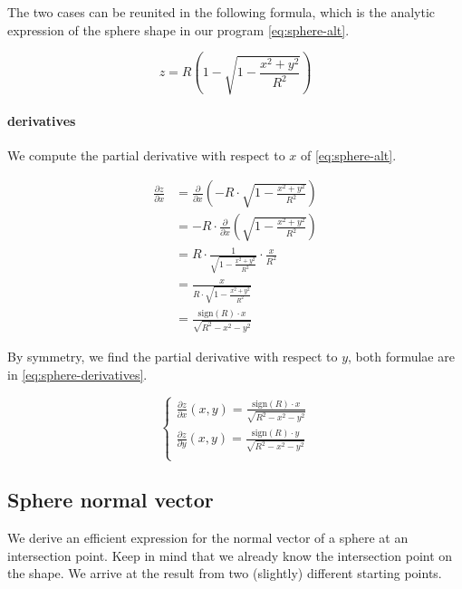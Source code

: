 The two cases can be reunited in the following formula, which is the
analytic expression of the sphere shape in our program \cref{eq:sphere-alt}.

\begin{equation} \label{eq:sphere-alt}
z = R \left( 1 - \sqrt{1 - \frac{x^2 + y^2}{R^2}} \right)
\end{equation}

\paragraph{derivatives}
We compute the partial derivative with respect to $x$ of \cref{eq:sphere-alt}.

\begin{equation} \begin{split}
\frac{\partial z}{\partial x} & = 
\frac{\partial}{\partial x}
\left( -R \cdot \sqrt{1 - \frac{x^2 + y^2}{R^2}} \right) \\
& = - R \cdot \frac{\partial}{\partial x}
\left( \sqrt{1 - \frac{x^2 + y^2}{R^2}} \right) \\
& = R \cdot \frac{1}{\sqrt{1 - \frac{x^2 + y^2}{R^2}}} \cdot
\frac{x}{R^2} \\
& = \frac{x}{R \cdot \sqrt{1 - \frac{x^2 + y^2}{R^2}}} \\
& = \frac{\textrm{sign}(R) \cdot x}{\sqrt{R^2 - x^2 -y^2}}
\end{split} \end{equation}

By symmetry, we find the partial derivative with respect to $y$, both
formulae are in \cref{eq:sphere-derivatives}.

\begin{equation} \label{eq:sphere-derivatives} \begin{cases}
\frac{\partial z}{\partial x} (x, y) =
\frac{\textrm{sign}(R) \cdot x}{\sqrt{R^2 - x^2 -y^2}} \\
\frac{\partial z}{\partial y} (x, y) =
\frac{\textrm{sign}(R) \cdot y}{\sqrt{R^2 - x^2 -y^2}} \\
\end{cases} \end{equation}

\subsection{Sphere normal vector}
We derive an efficient expression for the normal vector of a sphere at
an intersection point. Keep in mind that we already know the intersection
point on the shape. We arrive at the result from two (slightly) different
starting points.

